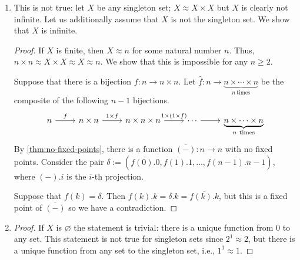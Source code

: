 \documentclass[a4paper]{article}
\newcommand{\To}[3]{#1\colon#2\to#3}
\begin{document}
\begin{enumerate}
\item This is not true: let $X$ be any singleton set; $X \approx X \times X$ but $X$ is clearly not infinite.
  Let us additionally assume that $X$ is not the singleton set.
  We show that $X$ is infinite.
  \begin{proof}
    If $X$ is finite, then $X \approx n$ for some natural number $n$.
    Thus, $n \times n \approx X \times X \approx X \approx n$.
    We show that this is impossible for any $n \geq 2$.

    Suppose that there is a bijection $\To{f}{n}{n \times n}$.
    Let $\To{\hat{f}}{n}{\underbrace{n \times \cdots \times n}_{n~\text{times}}}$ be the composite of the following $n - 1$ bijections.
    \[\begin{tikzcd}
	n & {n \times n} & {n \times n \times n} & \cdots & {\underbrace{n \times \cdots \times n}_{n~\text{times}}}
	\arrow["f", from=1-1, to=1-2]
	\arrow["{1 \times f}", from=1-2, to=1-3]
	\arrow["{1 \times (1 \times f)}", from=1-3, to=1-4]
	\arrow[from=1-4, to=1-5]
      \end{tikzcd}\]
    By \cref{thm:no-fixed-points}, there is a function $\To{\overline{(-)}}{n}{n}$ with no fixed points.
    Consider the pair $\delta := (\overline{f(0).0},\overline{f(1).1},\ldots,\overline{f(n-1).n-1})$, where $(-).i$ is the $i$-th projection.

    Suppose that $f(k) = \delta$.
    Then $f(k).k = \delta.k = \overline{f(k).k}$, but this is a fixed point of $\overline{(-)}$ so we have a contradiction.
  \end{proof}
\item
  \begin{proof}
    If $X$ is $\varnothing$ the statement is trivial: there is a unique function from $0$ to any set.
    This statement is not true for singleton sets since $2^{1} \approx 2$, but there is a unique function from any set to the singleton set, i.e., $1^{1} \approx 1$.
    

\end{proof}
\end{enumerate}
\end{document}
